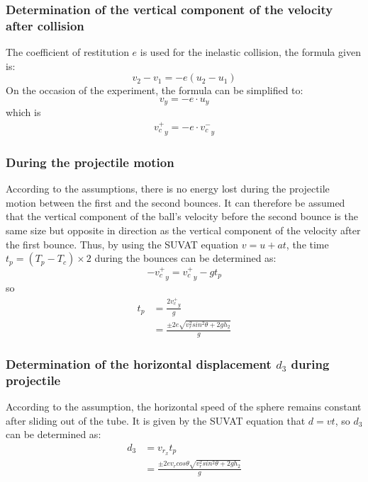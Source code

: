 \documentclass[conference]{IEEEtran}
\begin{document}
        \subsubsection{Determination of the vertical component of the velocity after collision}
            The coefficient of restitution $e$ is used for the inelastic collision, the formula given is:
            \begin{equation}
                v_2 - v_1 = -e(u_2-u_1) \nonumber
            \end{equation}
            On the occasion of the experiment, the formula can be simplified to:
            \begin{equation} 
                v_y = -e\cdot u_y \nonumber
            \end{equation}
            which is 
            \begin{equation}
                \begin{aligned}
                    {v^+_c}_y = -e\cdot {v^-_c}_y
                \end{aligned}  
            \end{equation}
        \subsubsection{During the projectile motion}
        According to the assumptions, there is no energy lost during the projectile motion between the first and the second bounces. It can therefore be assumed that the vertical component of the ball's velocity before the second bounce is the same size but opposite in direction as the vertical component of the velocity after the first bounce. Thus, by using the SUVAT equation $v = u + at$, the time $t_p = (T_p - T_c)\times2 $ during the bounces can be determined as:
        $$-{v^+_c}_y = {v^+_c}_y - gt_p$$
        so 
        \begin{equation}
            \begin{aligned}
                t_p &= \frac{2{v^+_c}_y}{g}\\
                    &= \frac{\pm2e\sqrt{{v^2_{r}sin^2\theta}+2gh_2}}{g}
            \end{aligned}
        \end{equation}
        \subsubsection{Determination of the horizontal displacement $d_3$ during projectile}
        According to the assumption, the horizontal speed of the sphere remains constant after sliding out of the tube. It is given by the SUVAT equation that $d = vt$, so $d_3$ can be determined as:
        \begin{equation}
            \begin{aligned}
                d_3 &= v_{r_x}t_p\\
                &=  \frac{\pm2ev_rcos\theta\sqrt{{v^2_{r}sin^2\theta}+2gh_2}}{g}
            \end{aligned}
        \end{equation}
\end{document}
